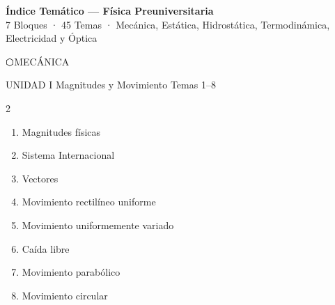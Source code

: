 
{
\hypersetup{linkcolor=AzulPizarra}
\tableofcontents
}
\newpage

\thispagestyle{fancy}

\begin{center}
  {\Large\sffamily\bfseries\color{AzulPizarra} Índice Temático — Física Preuniversitaria}\\[4pt]
  {\small\sffamily\color{GrisMedio} 7 Bloques · 45 Temas · Mecánica, Estática, Hidrostática, Termodinámica, Electricidad y Óptica}
\end{center}

\vspace{0.5cm}

\begin{tcolorbox}[enhanced, colback=AzulPizarra!90, colframe=DoradoAcadémico,
    arc=3pt, boxrule=1.5pt, left=8pt, right=8pt, top=6pt, bottom=6pt,
    fontupper=\sffamily\bfseries\large\color{white}]
  ⬡\quad MECÁNICA
\end{tcolorbox}

\begin{tcolorbox}[enhanced, colback=AzulPizarra, colframe=DoradoAcadémico,
    arc=2pt, boxrule=0.8pt, left=6pt, right=6pt, top=3pt, bottom=3pt,
    fontupper=\sffamily\bfseries\small\color{white}]
  UNIDAD I \hfill Magnitudes y Movimiento \hfill Temas 1–8
\end{tcolorbox}
\begin{multicols}{2}
  \begin{enumerate}[label=\textcolor{AzulPizarra}{\textbf{\arabic*.}},
      leftmargin=2em, itemsep=1pt]
    \item Magnitudes físicas
    \item Sistema Internacional
    \item Vectores
    \item Movimiento rectilíneo uniforme
    \item Movimiento uniformemente variado
    \item Caída libre
    \item Movimiento parabólico
    \item Movimiento circular
  \end{enumerate}
\end{multicols}

